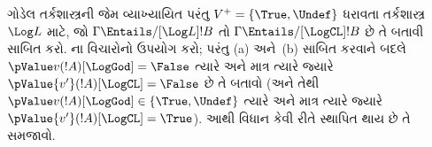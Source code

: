 \documentclass[../../../include/open-logic-section]{subfiles}
\begin{document}
\begin{prob}
  ગોડેલ તર્કશાસ્ત્રની જેમ વ્યાખ્યાયિત પરંતુ
  $V^+=\{\True,\Undef\}$ ધરાવતા તર્કશાસ્ત્ર~$\Log L$ માટે,
  જો $\Gamma \Entails/[\Log L] !B$ તો
  $\Gamma \Entails/[\LogCL] !B$ છે તે બતાવી
   સાબિત કરો.
  ના વિચારોનો ઉપયોગ કરો;
  પરંતુ (a) અને~(b) સાબિત કરવાને બદલે
  $\pValue v(!A)[\LogGod] = \False$ ત્યારે અને માત્ર ત્યારે જ્યારે
  $\pValue {v'}(!A)[\LogCL] = \False$ છે તે બતાવો
  (અને તેથી $\pValue v(!A)[\LogGod] \in \{\True,\Undef\}$ ત્યારે
  અને માત્ર ત્યારે જ્યારે $\pValue {v'}(!A)[\LogCL] = \True$).
  આથી વિધાન કેવી રીતે સ્થાપિત થાય છે તે સમજાવો.
\end{prob}
\end{document}
